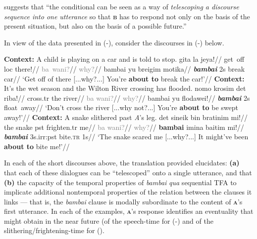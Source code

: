 \noindent\citet[101]{Harder1995} suggests that ``the conditional can be seen as a way of \textit{telescoping a discourse sequence into one utterance} so that \textbf{\textsc{b}} has to respond not only on the basis of the present situation, but also on the basis of a possible future.''






In view of the data presented in (-), consider the discourses in (-) below.


\pex[everylabel=\bf\sc,aboveexskip=1pt]\textbf{Context:} A child is playing on a car and is told to stop.
\a	\begingl 	\gla {}gita la jeya!//
\glb get~off {\sc loc} there!//
\endgl
\a[label=\textcolor{gray}{b}]\begingl\gla \textcolor{gray}{ba~wani?}//
\glb \textcolor{gray}{why?}//
\endgl
\a[label=\textbf{\textsc{a}}]\begingl
\gla bambai yu breigim motika//
\glb \textbf{\textit{bambai}} 2s break car//
\glft `Get off of there [...why?...] You're \textbf{about to} break the car!'\trailingcitation{[GT~16032017]}//
\endgl\xe
\pex[everylabel=\bf\sc,aboveexskip=1pt] \textbf{Context:} It's the wet season and the Wilton River crossing has flooded.
\a\begingl
\gla nomo krosim det riba!//
 cross.{\sc tr} the river//
\endgl
\a 	\begingl\gla \textcolor{gray}{ba wani?}//
\glb \textcolor{gray}{why?}//
\endgl
\a[label=\textbf{\textsc{a}}]\begingl\gla bambai yu flodawei!//
\glb \textbf{\textit{bambai}} 2s float~away//
\glft`Don't cross the river [...why not?...] You're \textbf{about to} be swept away!'\trailingcitation{[GT~16032017]}//\endgl\xe
\pex[everylabel=\bf\sc,aboveexskip=1pt]
\textbf{Context:} A snake slithered past \textit{A}'s leg.
\a\begingl
\gla det sineik bin bratinim mi!//
\glb the snake \gls{pst} frighten{\sc.tr} me//
\endgl
\a \begingl\gla \textcolor{gray}{ba wani?}//
\glb \textcolor{gray}{why?}//
\endgl
\a[label=\textbf{\textsc{a}}]\begingl\gla \textbf{bambai} imina baitim mi!//
\glb \textbf{\textit{bambai}} 3s.\gls{irr}:\gls{pst} bite\textsc{.tr} 1s//
\glft`The snake scared me [...why?...] It might've been \textbf{about to} bite me!'\trailingcitation{[GT~01052017]}//\endgl\xe



In each of the short discourses above, the translation provided elucidates: \textbf{(a)} that each of these dialogues can be ``telescoped'' onto a single utterance, and that \textbf{(b)} the capacity of the temporal properties of \textit{bambai} \textit{qua} sequential TFA to implicate additional nontemporal properties of the relation between the clauses it links --- that is, the \textit{bambai} clause is modally subordinate to the content of \textbf{\textsc{a}}'s first utterance. In each of the examples, \textsc{\textbf{a}}'s response identifies an eventuality that might obtain in the near future (of the speech-time for (-) and of the slithering\slash frightening-time for (). 

